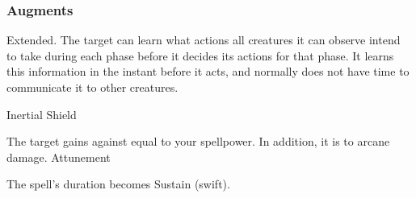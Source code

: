 \subsubsection{Augments}
 Extended.
The target can learn what actions all creatures it can observe intend to take during each phase before it decides its actions for that phase.
It learns this information in the instant before it acts, and normally does not have time to communicate it to other creatures.
\begin{spellsection}{Inertial Shield}
\begin{spellheader}
\end{spellheader}
\begin{spellcontent}
\begin{spelltargetinginfo}
\end{spelltargetinginfo}
\begin{spelleffects}
\spelleffect
The target gains  against  equal to your spellpower.
In addition, it is  to arcane damage.
\spelldur Attunement
\end{spelleffects}
\end{spellcontent}
\begin{spellfooter}
\miscastexplode
\end{spellfooter}
\begin{spellcantrip}
The spell's duration becomes Sustain (swift).
\end{spellcantrip}
\end{spellsection}
